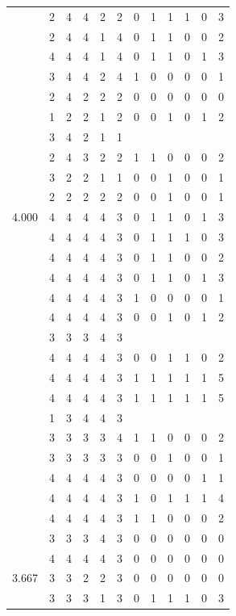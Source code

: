 \documentclass[]{msu-thesis}
\theoremstyle{definition}
\theoremstyle{definition}
\theoremstyle{definition}
\theoremstyle{remark}
\begin{document}
\begin{table}
{\begin{tabular}[t]{rrrrrrrrrrrr}
 & 2 & 4 & 4 & 2 & 2 & 0 & 1 & 1 & 1 & 0 & 3\\
 & 2 & 4 & 4 & 1 & 4 & 0 & 1 & 1 & 0 & 0 & 2\\
 & 4 & 4 & 4 & 1 & 4 & 0 & 1 & 1 & 0 & 1 & 3\\
 & 3 & 4 & 4 & 2 & 4 & 1 & 0 & 0 & 0 & 0 & 1\\
 & 2 & 4 & 2 & 2 & 2 & 0 & 0 & 0 & 0 & 0 & 0\\
 & 1 & 2 & 2 & 1 & 2 & 0 & 0 & 1 & 0 & 1 & 2\\
 & 3 & 4 & 2 & 1 & 1 &  &  &  &  &  & \\
 & 2 & 4 & 3 & 2 & 2 & 1 & 1 & 0 & 0 & 0 & 2\\
 & 3 & 2 & 2 & 1 & 1 & 0 & 0 & 1 & 0 & 0 & 1\\
 & 2 & 2 & 2 & 2 & 2 & 0 & 0 & 1 & 0 & 0 & 1\\
4.000 & 4 & 4 & 4 & 4 & 3 & 0 & 1 & 1 & 0 & 1 & 3\\
 & 4 & 4 & 4 & 4 & 3 & 0 & 1 & 1 & 1 & 0 & 3\\
 & 4 & 4 & 4 & 4 & 3 & 0 & 1 & 1 & 0 & 0 & 2\\
 & 4 & 4 & 4 & 4 & 3 & 0 & 1 & 1 & 0 & 1 & 3\\
 & 4 & 4 & 4 & 4 & 3 & 1 & 0 & 0 & 0 & 0 & 1\\
 & 4 & 4 & 4 & 4 & 3 & 0 & 0 & 1 & 0 & 1 & 2\\
 & 3 & 3 & 3 & 4 & 3 &  &  &  &  &  & \\
 & 4 & 4 & 4 & 4 & 3 & 0 & 0 & 1 & 1 & 0 & 2\\
 & 4 & 4 & 4 & 4 & 3 & 1 & 1 & 1 & 1 & 1 & 5\\
 & 4 & 4 & 4 & 4 & 3 & 1 & 1 & 1 & 1 & 1 & 5\\
 & 1 & 3 & 4 & 4 & 3 &  &  &  &  &  & \\
 & 3 & 3 & 3 & 3 & 4 & 1 & 1 & 0 & 0 & 0 & 2\\
 & 3 & 3 & 3 & 3 & 3 & 0 & 0 & 1 & 0 & 0 & 1\\
 & 4 & 4 & 4 & 4 & 3 & 0 & 0 & 0 & 0 & 1 & 1\\
 & 4 & 4 & 4 & 4 & 3 & 1 & 0 & 1 & 1 & 1 & 4\\
 & 4 & 4 & 4 & 4 & 3 & 1 & 1 & 0 & 0 & 0 & 2\\
 & 3 & 3 & 3 & 4 & 3 & 0 & 0 & 0 & 0 & 0 & 0\\
 & 4 & 4 & 4 & 4 & 3 & 0 & 0 & 0 & 0 & 0 & 0\\
3.667 & 3 & 3 & 2 & 2 & 3 & 0 & 0 & 0 & 0 & 0 & 0\\
 & 3 & 3 & 3 & 1 & 3 & 0 & 1 & 1 & 1 & 0 & 3\\

\end{tabular}}
\end{table}
\end{document}

